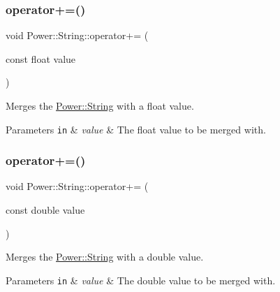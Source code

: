 \subsubsection{\texorpdfstring{operator+=()}{operator+=()}\hspace{0.1cm}{\footnotesize\ttfamily [10/11]}}
{\footnotesize\ttfamily void Power\+::\+String\+::operator+= (\begin{DoxyParamCaption}\item[{const float}]{value }\end{DoxyParamCaption})\hspace{0.3cm}{\ttfamily [inline]}}



Merges the \hyperlink{class_power_1_1_string}{Power\+::\+String} with a float value. 


\begin{DoxyParams}[1]{Parameters}
\mbox{\tt in}  & {\em value} & The float value to be merged with. \\
\hline
\end{DoxyParams}
\mbox{\label{class_power_1_1_string_a8689efc9a824d938249a78f02918e57d}} 
\subsubsection{\texorpdfstring{operator+=()}{operator+=()}\hspace{0.1cm}{\footnotesize\ttfamily [11/11]}}
{\footnotesize\ttfamily void Power\+::\+String\+::operator+= (\begin{DoxyParamCaption}\item[{const double}]{value }\end{DoxyParamCaption})\hspace{0.3cm}{\ttfamily [inline]}}



Merges the \hyperlink{class_power_1_1_string}{Power\+::\+String} with a double value. 


\begin{DoxyParams}[1]{Parameters}
\mbox{\tt in}  & {\em value} & The double value to be merged with. \\
\hline
\end{DoxyParams}
\mbox{\label{class_power_1_1_string_a0e79c36bc1ac080cdc9bbe491cea5b32}} 

